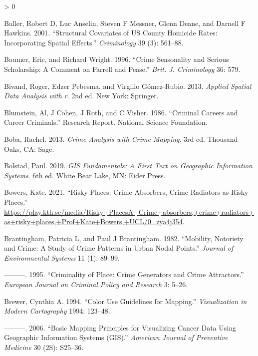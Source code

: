 \documentclass[
  krantz2]{krantz}
\newlength{\cslhangindent}
\newenvironment{CSLReferences}[2] %
 {%
  \setlength{\parindent}{0pt}
  \ifodd #1 \everypar{\setlength{\hangindent}{\cslhangindent}}\ignorespaces\fi
  \ifnum #2 > 0
  \setlength{\parskip}{#2\baselineskip}
  \fi
 }%
 {}
\begin{document}
\begin{CSLReferences}{1}{0}
\leavevmode\hypertarget{ref-Baller_2001}{}%
Baller, Robert D, Luc Anselin, Steven F Messner, Glenn Deane, and Darnell F Hawkins. 2001. {``Structural Covariates of US County Homicide Rates: Incorporating Spatial Effects.''} \emph{Criminology} 39 (3): 561--88.

\leavevmode\hypertarget{ref-Baumer_1996}{}%
Baumer, Eric, and Richard Wright. 1996. {``Crime Seasonality and Serious Scholarship: A Comment on Farrell and Pease.''} \emph{Brit. J. Criminology} 36: 579.

\leavevmode\hypertarget{ref-Bivand_2013}{}%
Bivand, Roger, Edzer Pebesma, and Virgilio Gómez-Rubio. 2013. \emph{Applied Spatial Data Analysis with r}. 2nd ed. New York: Springer.

\leavevmode\hypertarget{ref-Blumstein_1986}{}%
Blumstein, Al, J Cohen, J Roth, and C Visher. 1986. {``Criminal Careers and Career Criminals.''} Research Report. National Science Foundation.

\leavevmode\hypertarget{ref-Boba_2013}{}%
Boba, Rachel. 2013. \emph{Crime Analysis with Crime Mapping}. 3rd ed. Thousand Oaks, CA: Sage.

\leavevmode\hypertarget{ref-Bolstad_2019}{}%
Bolstad, Paul. 2019. \emph{GIS Fundamentals: A First Text on Geographic Information Systems}. 6th ed. White Bear Lake, MN: Eider Press.

\leavevmode\hypertarget{ref-Bowers_2021}{}%
Bowers, Kate. 2021. {``Risky Places: Crime Absorbers, Crime Radiators as Risky Places.''} \url{https://play.kth.se/media/Risky+PlacesA+Crime+absorbers,+crime+radiators+as+risky+places,+Prof+Kate+Bowers,+UCL/0_zya4j354}.

\leavevmode\hypertarget{ref-Brantingham_1982}{}%
Brantingham, Patricia L, and Paul J Brantingham. 1982. {``Mobility, Notoriety and Crime: A Study of Crime Patterns in Urban Nodal Points.''} \emph{Journal of Environmental Systems} 11 (1): 89--99.

\leavevmode\hypertarget{ref-Brantingham_1995}{}%
---------. 1995. {``Criminality of Place: Crime Generators and Crime Attractors.''} \emph{European Journal on Criminal Policy and Research} 3: 5--26.

\leavevmode\hypertarget{ref-Brewer_1994}{}%
Brewer, Cynthia A. 1994. {``Color Use Guidelines for Mapping.''} \emph{Visualization in Modern Cartography} 1994: 123--48.

\leavevmode\hypertarget{ref-Brewer_2006}{}%
---------. 2006. {``Basic Mapping Principles for Visualizing Cancer Data Using Geographic Information Systems (GIS).''} \emph{American Journal of Preventive Medicine} 30 (2S): S25--36.


\end{CSLReferences}
\end{document}

